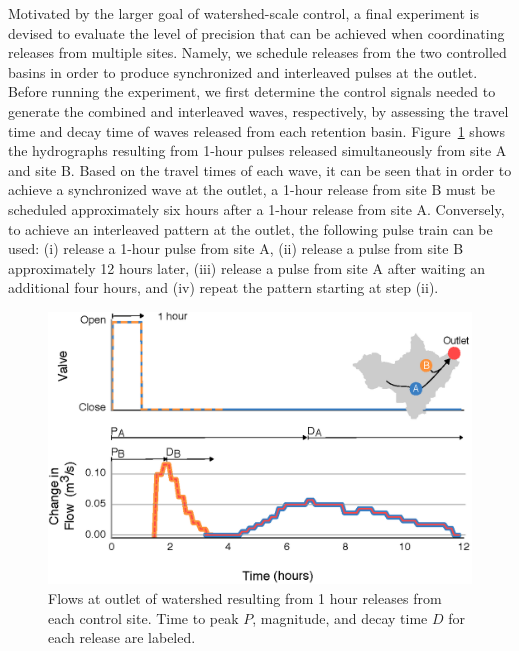 Motivated by the larger goal of watershed-scale control, a final experiment is devised to evaluate the level of precision that can be achieved when coordinating releases from multiple sites. Namely, we schedule releases from the two controlled basins in order to produce synchronized and interleaved pulses at the outlet. Before running the experiment, we first determine the control signals needed to generate the combined and interleaved waves, respectively, by assessing the travel time and decay time of waves released from each retention basin. Figure~\ref{fig-ch2:6} shows the hydrographs resulting from 1-hour pulses released simultaneously from site A and site B. Based on the travel times of each wave, it can be seen that in order to achieve a synchronized wave at the outlet, a 1-hour release from site B must be scheduled approximately six hours after a 1-hour release from site A. Conversely, to achieve an interleaved pattern at the outlet, the following pulse train can be used: (i) release a 1-hour pulse from site A, (ii) release a pulse from site B approximately 12 hours later, (iii) release a pulse from site A after waiting an additional four hours, and (iv) repeat the pattern starting at step (ii).

\begin{figure}[H]
    \centering
    \includegraphics[width=\textwidth]{gfx/Chapter-2/Figure4.eps}
    \caption{Flows at outlet of watershed resulting from 1 hour releases from each control site. Time to peak $P$, magnitude, and decay time $D$ for each release are labeled.}\label{fig-ch2:6}
\end{figure}


